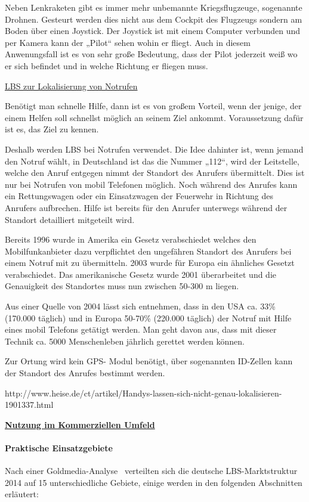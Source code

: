 Neben Lenkraketen gibt es immer mehr unbemannte Kriegsflugzeuge, sogenannte Drohnen. Gesteurt werden dies nicht aus dem Cockpit des Flugzeugs sondern am Boden über einen Joystick. Der Joystick ist mit einem Computer verbunden und per Kamera kann der „Pilot“ sehen wohin er fliegt. Auch in diesem Anwenungsfall ist es von sehr große Bedeutung, dass der Pilot jederzeit weiß wo er sich befindet und in welche Richtung er fliegen muss.

\underline{LBS zur Lokalisierung von Notrufen}

Benötigt man schnelle Hilfe, dann ist es von großem Vorteil, wenn der jenige, der einem Helfen soll schnellst möglich an seinem Ziel ankommt. Voraussetzung dafür ist es, das Ziel zu kennen.

Deshalb werden LBS bei Notrufen verwendet. Die Idee dahinter ist, wenn jemand den Notruf wählt, in Deutschland ist das die Nummer „112“, wird der Leitstelle, welche den Anruf entgegen nimmt der Standort des Anrufers übermittelt. Dies ist nur bei Notrufen von mobil Telefonen möglich. Noch während des Anrufes kann ein Rettungswagen oder ein Einsatzwagen der Feuerwehr in Richtung des Anrufers aufbrechen. Hilfe ist bereits für den Anrufer unterwegs während der Standort detailliert mitgeteilt wird.

Bereits 1996 wurde in Amerika ein Gesetz verabschiedet welches den Mobilfunkanbieter dazu verpflichtet den ungefähren Standort des Anrufers bei einem Notruf mit zu übermitteln.  2003 wurde für Europa ein ähnliches Gesetzt verabschiedet. Das amerikanische Gesetz wurde 2001 überarbeitet und die Genauigkeit des Standortes muss nun zwischen 50-300 m liegen.  

Aus einer Quelle von 2004 lässt sich entnehmen, dass in den USA ca. 33\% (170.000 täglich) und in Europa 50-70\% (220.000 täglich) der Notruf mit Hilfe eines mobil Telefons getätigt werden. Man geht davon aus, dass mit dieser Technik ca. 5000 Menschenleben jährlich gerettet werden können.

Zur Ortung wird kein GPS- Modul benötigt, über sogenannten ID-Zellen kann der Standort des Anrufes bestimmt werden.

http://www.heise.de/ct/artikel/Handys-lassen-sich-nicht-genau-lokalisieren-1901337.html


\textbf{ \underline{Nutzung im Kommerziellen Umfeld } }

\paragraph{Praktische Einsatzgebiete}
Nach einer Goldmedia-Analyse~\cite[S.9]{goldmedia:lbs} verteilten sich die deutsche LBS-Marktstruktur 2014 auf 15 unterschiedliche Gebiete, einige werden in den folgenden Abschnitten erläutert:\\


